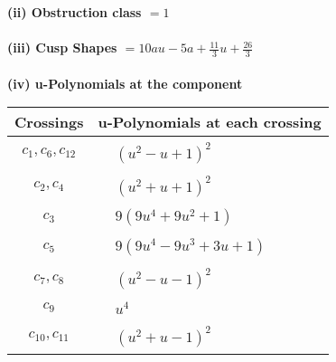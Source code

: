 \documentclass[1p]{elsarticle_modified}
\theoremstyle{definition}
\begin{document}
\flushleft \textbf{(ii) Obstruction class $= 1$}\\~\\
\flushleft \textbf{(iii) Cusp Shapes $= 10 a u-5 a+\frac{11}{3} u+\frac{26}{3}$}\\~\\
\newpage\renewcommand{\arraystretch}{1}
\flushleft \textbf{(iv) u-Polynomials at the component}\newline \\
\begin{tabular}{m{50pt}|m{274pt}}
Crossings & \hspace{64pt}u-Polynomials at each crossing \\
\hline $$\begin{aligned}c_{1},c_{6},c_{12}\end{aligned}$$&$\begin{aligned}
&(u^2- u+1)^2
\end{aligned}$\\
\hline $$\begin{aligned}c_{2},c_{4}\end{aligned}$$&$\begin{aligned}
&(u^2+u+1)^2
\end{aligned}$\\
\hline $$\begin{aligned}c_{3}\end{aligned}$$&$\begin{aligned}
&9(9 u^4+9 u^2+1)
\end{aligned}$\\
\hline $$\begin{aligned}c_{5}\end{aligned}$$&$\begin{aligned}
&9(9 u^4-9 u^3+3 u+1)
\end{aligned}$\\
\hline $$\begin{aligned}c_{7},c_{8}\end{aligned}$$&$\begin{aligned}
&(u^2- u-1)^2
\end{aligned}$\\
\hline $$\begin{aligned}c_{9}\end{aligned}$$&$\begin{aligned}
&u^4
\end{aligned}$\\
\hline $$\begin{aligned}c_{10},c_{11}\end{aligned}$$&$\begin{aligned}
&(u^2+u-1)^2
\end{aligned}$\\
\hline
\end{tabular}\\~\\
\end{document}
